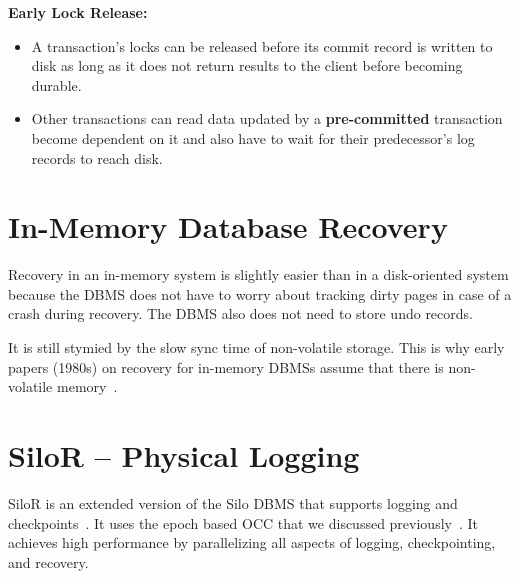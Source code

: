 \documentclass[11pt]{article}
\begin{document}
\textbf{Early Lock Release:}
\begin{itemize}
    \item
    A transaction's locks can be released before its commit record is written to disk as long as 
    it does not return results to the client before becoming durable.
    
    \item
    Other transactions can read data updated by a \textbf{pre-committed} transaction become 
dependent on     it and also have to wait for their predecessor's log records to reach disk.
\end{itemize}

\section{In-Memory Database Recovery}
Recovery in an in-memory system is slightly easier than in a disk-oriented system because the DBMS 
does not have to worry about tracking dirty pages in case of a crash during recovery. The DBMS also 
does not need to store undo records.

It is still stymied by the slow sync time of non-volatile storage. This is why early papers 
(1980s) on recovery for in-memory DBMSs assume that there is non-volatile memory~\cite{p104-lehman}.

\section{SiloR -- Physical Logging}
SiloR is an extended version of the Silo DBMS that supports logging and 
checkpoints~\cite{zheng-osdi14}.
It uses the epoch based OCC that we discussed previously~\cite{tu-sosp2013}.
It achieves high performance by parallelizing all aspects of logging, checkpointing, and recovery.

\end{document}

